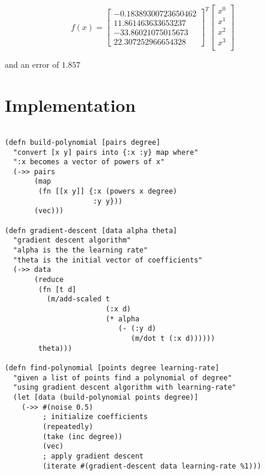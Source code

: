 \documentclass[parskip=half,a4paper]{scrartcl}
\begin{document}
$$
f(x) = \begin{bmatrix}
-0.18389300723650462\\
11.861463633653237\\
-33.86021075015673\\
22.307252966654328
\end{bmatrix}^T
\begin{bmatrix}
x^0 \\
x^1 \\
x^2 \\
x^3 \\
\end{bmatrix}
$$

and an error of $1.857$

\section*{Implementation}

\begin{verbatim}

(defn build-polynomial [pairs degree]
  "convert [x y] pairs into {:x :y} map where"
  ":x becomes a vector of powers of x"
  (->> pairs
       (map
        (fn [[x y]] {:x (powers x degree)
                     :y y}))
       (vec)))

(defn gradient-descent [data alpha theta]
  "gradient descent algorithm"
  "alpha is the the learning rate"
  "theta is the initial vector of coefficients"
  (->> data
       (reduce
        (fn [t d]
          (m/add-scaled t
                        (:x d)
                        (* alpha
                           (- (:y d)
                              (m/dot t (:x d))))))
        theta)))

(defn find-polynomial [points degree learning-rate]
  "given a list of points find a polynomial of degree"
  "using gradient descent algorithm with learning-rate"
  (let [data (build-polynomial points degree)]
    (->> #(noise 0.5)
         ; initialize coefficients
         (repeatedly)
         (take (inc degree))
         (vec)
         ; apply gradient descent
         (iterate #(gradient-descent data learning-rate %1)))
\end{verbatim}
\end{document}
